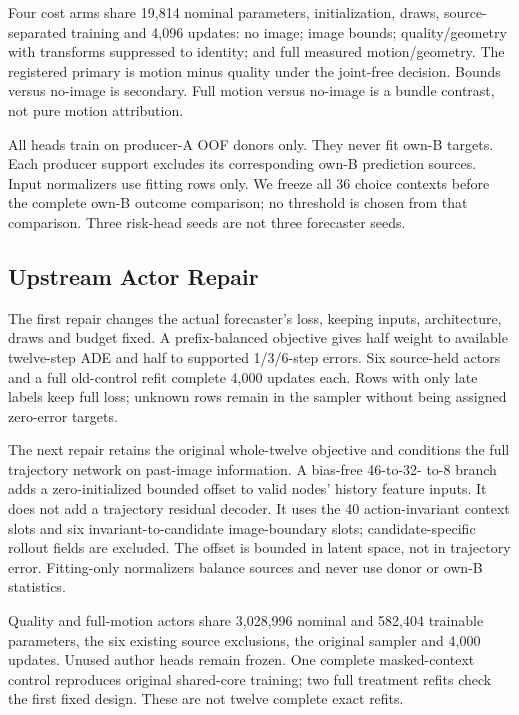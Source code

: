 \documentclass[10pt,twocolumn,letterpaper]{article}
\begin{document}
Four cost arms share 19,814 nominal parameters, initialization, draws, source-separated training and 4,096 updates: no image; image bounds; quality/geometry with transforms suppressed to identity; and full measured motion/geometry. The registered primary is motion minus quality under the joint-free decision. Bounds versus no-image is secondary. Full motion versus no-image is a bundle contrast, not pure motion attribution.


All heads train on producer-A OOF donors only. They never fit own-B targets. Each producer support excludes its corresponding own-B prediction sources. Input normalizers use fitting rows only. We freeze all 36 choice contexts before the complete own-B outcome comparison; no threshold is chosen from that comparison. Three risk-head seeds are not three forecaster seeds.


\subsection{Upstream Actor Repair}

The first repair changes the actual forecaster's loss, keeping inputs, architecture, draws and budget fixed. A prefix-balanced objective gives half weight to available twelve-step ADE and half to supported 1/3/6-step errors. Six source-held actors and a full old-control refit complete 4,000 updates each. Rows with only late labels keep full loss; unknown rows remain in the sampler without being assigned zero-error targets.


The next repair retains the original whole-twelve objective and conditions the full trajectory network on past-image information. A bias-free 46-to-32- to-8 branch adds a zero-initialized bounded offset to valid nodes' history feature inputs. It does not add a trajectory residual decoder. It uses the 40 action-invariant context slots and six invariant-to-candidate image-boundary slots; candidate-specific rollout fields are excluded. The offset is bounded in latent space, not in trajectory error. Fitting-only normalizers balance sources and never use donor or own-B statistics.


Quality and full-motion actors share 3,028,996 nominal and 582,404 trainable parameters, the six existing source exclusions, the original sampler and 4,000 updates. Unused author heads remain frozen. One complete masked-context control reproduces original shared-core training; two full treatment refits check the first fixed design. These are not twelve complete exact refits.
\end{document}

